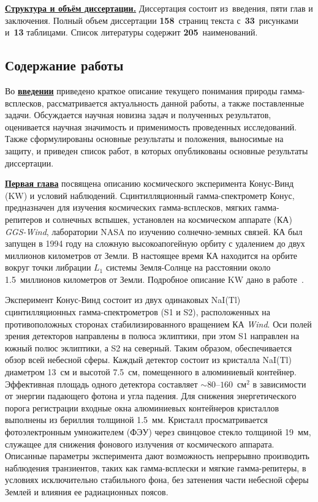 

\underline{\textbf{Структура и объём диссертации.}} Диссертация состоит из~введения, 
пяти глав и заключения. Полный объем диссертации \textbf{158}~страниц текста 
с~\textbf{33}~рисунками и~\textbf{13} таблицами. Список литературы содержит \textbf{205}~наименований.

\subsection*{\Large Содержание работы}
Во \underline{\textbf{введении}} приведено краткое описание текущего понимания природы гамма-всплесков,
рассматривается актуальность данной работы, а также поставленные задачи. 
Обсуждается научная новизна задач и полученных результатов, 
оценивается научная значимость и применимость проведенных исследований.
Также сформулированы основные результаты и положения, выносимые на защиту, и приведен
список работ, в которых опубликованы основные результаты диссертации.

\underline{\textbf{Первая глава}} посвящена описанию космического эксперимента
Конус-Винд (KW) и условий наблюдений. 
Сцинтилляционный гамма-спектрометр Конус, предназначен для изучения космических 
гамма-всплесков, мягких гамма-репитеров и солнечных вспышек,
установлен на космическом аппарате (КА) \textit{GGS-Wind}, лаборатории NASA по изучению 
солнечно-земных связей. КА был запущен в 1994 году на сложную высокоапогейную орбиту 
с удалением до двух миллионов километров от Земли. В настоящее время КА находится 
на орбите вокруг точки либрации $L_1$ системы Земля-Солнце на расстоянии около 
1.5~миллионов километров от Земли.
Подробное описание KW дано в работе~\citep{Aptekar_1995SSR}.

Эксперимент Конус-Винд состоит из двух одинаковых NaI(Tl) сцинтилляционных 
гамма-спектрометров (S1 и S2), расположенных на противоположных сторонах 
стабилизированного вращением КА \textit{Wind}. 
Оси полей зрения детекторов 
направлены в полюса эклиптики, при этом S1 направлен на южный полюс эклиптики, 
а S2 на северный. Таким образом, обеспечивается обзор всей небесной сферы. 
Каждый детектор состоит из кристалла NaI(Tl) диаметром 13~см и высотой 7.5~см, 
помещенного в алюминиевый контейнер.
Эффективная площадь одного детектора составляет $\sim 80\textrm{--}160$~см$^2$ в 
зависимости от энергии падающего фотона и угла падения.  
Для снижения энергетического порога регистрации входные окна алюминиевых 
контейнеров кристаллов выполнены из бериллия толщиной 1.5~мм. 
Кристалл просматривается фотоэлектронным 
умножителем (ФЭУ) через свинцовое стекло толщиной 19~мм, служащее для снижения фонового 
излучения от космического аппарата. Описанные параметры эксперимента дают 
возможность непрерывно производить наблюдения транзиентов, таких как гамма-всплески 
и мягкие гамма-репитеры, в условиях исключительно стабильного фона, 
без затенения части небесной сферы Землей и влияния ее радиационных поясов. 

